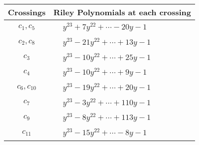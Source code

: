 \documentclass[1p]{elsarticle_modified}
\theoremstyle{definition}
\begin{document}
\begin{tabular}{m{50pt}|m{274pt}}
Crossings & \hspace{64pt}Riley Polynomials at each crossing \\
\hline $$\begin{aligned}c_{1},c_{5}\end{aligned}$$&$\begin{aligned}
&y^{23}+7 y^{22}+\cdots-20 y-1
\end{aligned}$\\
\hline $$\begin{aligned}c_{2},c_{8}\end{aligned}$$&$\begin{aligned}
&y^{23}-21 y^{22}+\cdots+13 y-1
\end{aligned}$\\
\hline $$\begin{aligned}c_{3}\end{aligned}$$&$\begin{aligned}
&y^{23}-10 y^{22}+\cdots+25 y-1
\end{aligned}$\\
\hline $$\begin{aligned}c_{4}\end{aligned}$$&$\begin{aligned}
&y^{23}-10 y^{22}+\cdots+9 y-1
\end{aligned}$\\
\hline $$\begin{aligned}c_{6},c_{10}\end{aligned}$$&$\begin{aligned}
&y^{23}-19 y^{22}+\cdots+20 y-1
\end{aligned}$\\
\hline $$\begin{aligned}c_{7}\end{aligned}$$&$\begin{aligned}
&y^{23}-3 y^{22}+\cdots+110 y-1
\end{aligned}$\\
\hline $$\begin{aligned}c_{9}\end{aligned}$$&$\begin{aligned}
&y^{23}-8 y^{22}+\cdots+113 y-1
\end{aligned}$\\
\hline $$\begin{aligned}c_{11}\end{aligned}$$&$\begin{aligned}
&y^{23}-15 y^{22}+\cdots-8 y-1
\end{aligned}$\\
\hline
\end{tabular}\\~\\
\end{document}
